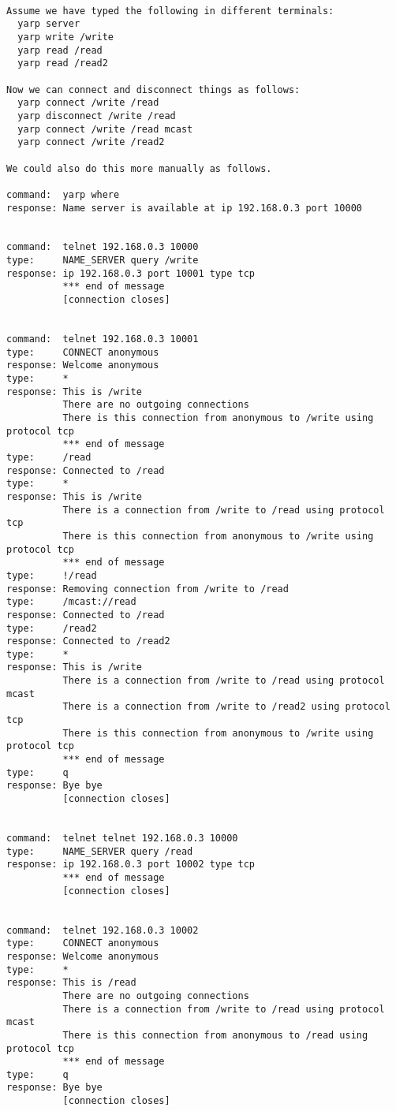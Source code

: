 \begin{verbatim}

Assume we have typed the following in different terminals:
  yarp server
  yarp write /write
  yarp read /read
  yarp read /read2

Now we can connect and disconnect things as follows:
  yarp connect /write /read
  yarp disconnect /write /read
  yarp connect /write /read mcast
  yarp connect /write /read2

We could also do this more manually as follows.

command:  yarp where
response: Name server is available at ip 192.168.0.3 port 10000


command:  telnet 192.168.0.3 10000
type:     NAME_SERVER query /write
response: ip 192.168.0.3 port 10001 type tcp
          *** end of message
          [connection closes]


command:  telnet 192.168.0.3 10001
type:     CONNECT anonymous
response: Welcome anonymous
type:     *
response: This is /write
          There are no outgoing connections
          There is this connection from anonymous to /write using protocol tcp
          *** end of message
type:     /read
response: Connected to /read
type:     *
response: This is /write
          There is a connection from /write to /read using protocol tcp
          There is this connection from anonymous to /write using protocol tcp
          *** end of message
type:     !/read
response: Removing connection from /write to /read
type:     /mcast://read
response: Connected to /read
type:     /read2
response: Connected to /read2
type:     *
response: This is /write
          There is a connection from /write to /read using protocol mcast
          There is a connection from /write to /read2 using protocol tcp
          There is this connection from anonymous to /write using protocol tcp
          *** end of message
type:     q
response: Bye bye
          [connection closes]


command:  telnet telnet 192.168.0.3 10000
type:     NAME_SERVER query /read
response: ip 192.168.0.3 port 10002 type tcp
          *** end of message
          [connection closes]


command:  telnet 192.168.0.3 10002
type:     CONNECT anonymous
response: Welcome anonymous
type:     *
response: This is /read
          There are no outgoing connections
          There is a connection from /write to /read using protocol mcast
          There is this connection from anonymous to /read using protocol tcp
          *** end of message
type:     q
response: Bye bye
          [connection closes]

\end{verbatim}


